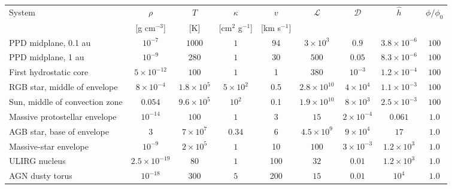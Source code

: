 \begin{table}
    \centering
    \small
    \setlength{\tabcolsep}{2.5pt}
    \begin{tabular}{lcccccccc}
    \hline
    System & $\rho$ & $T$ & $\kappa$ & $v$ & $\mathcal{L}$ & $\mathcal{D}$ & $\hat{h}$ & $\phi/\phi_0$ \\
    & [g cm$^{-3}$] & [K] & [cm$^2$ g$^{-1}$] & [km s$^{-1}$] \\
    \hline
    PPD midplane, 0.1 au & $10^{-7}$ & $1000$ & $1$ & 94 & $3\times10^{3}$ & $0.9$ & $3.8\times10^{-6}$ & $100$ \\
    PPD midplane, 1 au & $10^{-9}$ & $280$ & $1$ & 30 & $500$ & $0.05$ & $8.3\times10^{-6}$ & $100$ \\
    First hydrostatic core & $5\times10^{-12}$ & $100$ & $1$ & 1 & $380$ & $10^{-3}$ & $1.2\times10^{-4}$ & $100$ \\
    RGB star, middle of envelope & $8\times10^{-4}$ & $1.8\times10^{5}$ & $5\times10^{2}$ & 0.5 & $2.8\times10^{10}$ & $4\times10^{4}$ & $1.1\times10^{-3}$ & $100$ \\
    Sun, middle of convection zone & $0.054$ & $9.6\times10^{5}$ & $10^{2}$ & 0.1 & $1.9\times10^{10}$ & $8\times10^{3}$ & $2.5\times10^{-3}$ & $100$ \\
    Massive protostellar envelope & $10^{-14}$ & $100$ & $1$ & 3 & $15$ & $2\times10^{-4}$ & $0.061$ & $1.0$ \\
    AGB star, base of envelope & $3$ & $7\times10^{7}$ & $0.34$ & 6 & $4.5\times10^{9}$ & $9\times10^{4}$ & $17$ & $1.0$ \\
    Massive-star envelope & $10^{-9}$ & $2\times10^{5}$ & $1$ & 10 & $100$ & $3\times10^{-3}$ & $1.2\times10^{3}$ & $1.0$ \\
    ULIRG nucleus & $2.5\times10^{-19}$ & $80$ & $1$ & 100 & $32$ & $0.01$ & $1.2\times10^{3}$ & $1.0$ \\
    AGN dusty torus & $10^{-18}$ & $300$ & $5$ & 200 & $15$ & $0.01$ & $10^{4}$ & $1.0$ \\
    \hline
    \end{tabular}

\end{table}
